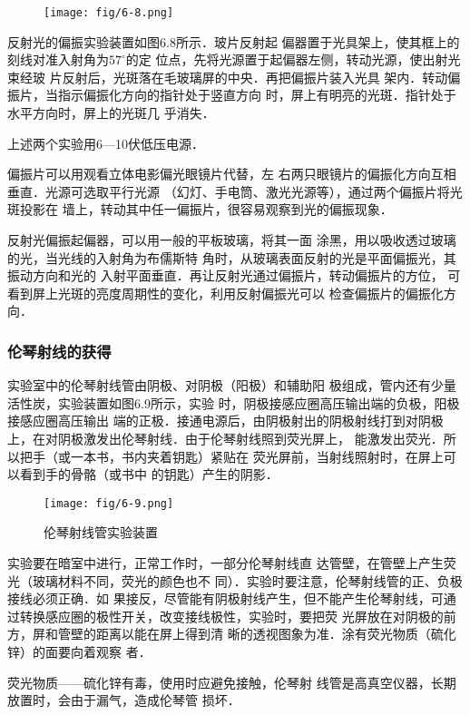\begin{figure}[htp]
    \centering
    \texttt{[image: fig/6-8.png]}
    \caption{}
\end{figure}

反射光的偏振实验装置如图6.8所示．玻片反射起
偏器置于光具架上，使其框上的刻线对准入射角为$57^{\circ}$的定
位点，先将光源置于起偏器左侧，转动光源，使出射光束经玻
片反射后，光斑落在毛玻璃屏的中央．再把偏振片装入光具
架内．转动偏振片，当指示偏振化方向的指针处于竖直方向
时，屏上有明亮的光斑．指针处于水平方向时，屏上的光斑几
乎消失．

上述两个实验用6—10伏低压电源．

偏振片可以用观看立体电影偏光眼镜片代替，左
右两只眼镜片的偏振化方向互相垂直．光源可选取平行光源
（幻灯、手电筒、激光光源等），通过两个偏振片将光斑投影在
墙上，转动其中任一偏振片，很容易观察到光的偏振现象．

反射光偏振起偏器，可以用一般的平板玻璃，将其一面
涂黑，用以吸收透过玻璃的光，当光线的入射角为布儒斯特
角时，从玻璃表面反射的光是平面偏振光，其振动方向和光的
入射平面垂直．再让反射光通过偏振片，转动偏振片的方位，
可看到屏上光斑的亮度周期性的变化，利用反射偏振光可以
检查偏振片的偏振化方向．

\subsubsection{伦琴射线的获得}
实验室中的伦琴射线管由阴极、对阴极（阳极）和辅助阳
极组成，管内还有少量活性炭，实验装置如图6.9所示，实验
时，阴极接感应圈高压输出端的负极，阳极接感应圈高压输出
端的正极．接通电源后，由阴极射出的阴极射线打到对阴极
上，在对阴极激发出伦琴射线．由于伦琴射线照到荧光屏上，
能激发出荧光．所以把手（或一本书，书内夹着钥匙）紧贴在
荧光屏前，当射线照射时，在屏上可以看到手的骨骼（或书中
的钥匙）产生的阴影．
\begin{figure}[htp]
    \centering
\texttt{[image: fig/6-9.png]}
    \caption{伦琴射线管实验装置}
\end{figure}

实验要在暗室中进行，正常工作时，一部分伦琴射线直
达管壁，在管壁上产生荧光（玻璃材料不同，荧光的颜色也不
同）．实验时要注意，伦琴射线管的正、负极接线必须正确．如
果接反，尽管能有阴极射线产生，但不能产生伦琴射线，可通
过转换感应圈的极性开关，改变接线极性，实验时，要把荧
光屏放在对阴极的前方，屏和管壁的距离以能在屏上得到清
晰的透视图象为准．涂有荧光物质（硫化锌）的面要向着观察
者．

荧光物质——硫化锌有毒，使用时应避免接触，伦琴射
线管是高真空仪器，长期放置时，会由于漏气，造成伦琴管
损坏．

